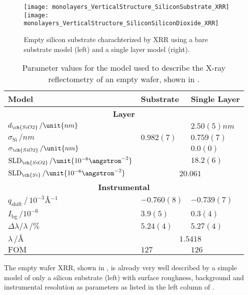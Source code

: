\documentclass[\main/dresen_thesis.tex]{subfiles}
\begin{document}
  \begin{figure}[tb]
    \centering
    \texttt{[image: monolayers\_VerticalStructure\_SiliconSubstrate\_XRR]}
    \texttt{[image: monolayers\_VerticalStructure\_SiliconSiliconDioxide\_XRR]}
    \caption{\label{fig:monolayers:structure:emptySiliconWafer}Empty silicon substrate charachterized by XRR using a bare substrate model (left) and a single layer model (right).}
  \end{figure}
  \begin{table}[ht]
    \centering
    \caption{\label{tab:monolayers:structure:emptySiliconWafer}Parameter values for the model used to describe the X-ray reflectometry of an empty wafer, shown in .}
    \begin{tabular}{l | l | l}
      \hline
      Model&
      \textbf{Substrate} &
      \textbf{Single Layer}\\
      \hline
      \multicolumn{3}{c}{\textbf{Layer}}\\
      \hline
      $d_{\ch{SiO2}} \,/\unit{nm}$ &
        &
        $2.50(5) \unit{nm}$ \\
      $\sigma_\mathrm{Si}\,/\unit{nm}$ &
        $0.982(7)$ &
        $0.759(7)$ \\
      $\sigma_{\ch{SiO2}}\,/\unit{nm}$ &
        &
        $0.0(0)$ \\
      $\mathrm{SLD}_{\ch{SiO2}}\,/\unit{10^{-6} \angstrom^{-2}}$ &
        &
        $18.2(6)$ \\
      $\mathrm{SLD}_{\ch{Si}} \, / \unit{10^{-6} \angstrom^{-2}}$ &
        \multicolumn{2}{c}{$20.061$} \\
      \hline
      \multicolumn{3}{c}{\textbf{Instrumental}}\\
      \hline
      $q_\mathrm{shift} \,/\, \unit{10^{-3} \angstrom^{-1}}$ &
        $-0.760(8)$ &
        $-0.739(7)$ \\
      $I_\mathrm{bg} \, / \unit{10^{-6}}$ &
        $3.9(5)$ &
        $0.3(4)$ \\
      $\Delta \lambda / \lambda \, / \%$ &
        $5.24(4)$ &
        $5.27(4)$ \\
      $\lambda \, / \unit{\angstrom}$ &
        \multicolumn{2}{c}{$1.5418$} \\
      \hline
      $\mathrm{FOM}$ &
        $127$ &
        $126$ \\
      \hline
    \end{tabular}
  \end{table}
  The empty wafer XRR, shown in , is already very well described by a simple model of only a silicon substrate (left) with surface roughness, background and instrumental resolution as parameters as listed in the left column of .
\end{document}
